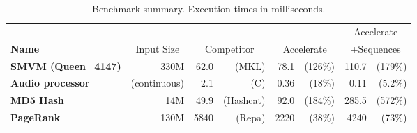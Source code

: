 


\begin{table}
\begin{center}
\begin{tabular}{lrrrrrrr}

                        &
                        &
                        &
                        &
                        &
                        & \multicolumn{2}{c}{Accelerate}
                        \\

  \textbf{Name}         & \multicolumn{1}{c}{Input Size}
                        & \multicolumn{2}{c}{Competitor}
                        & \multicolumn{2}{c}{Accelerate}
                        & \multicolumn{2}{c}{+Sequences}
                        \\

  \midrule

  \textbf{SMVM (Queen\_4147)}
                        & 330M
                        & 62.0
                        & (MKL)
                        & 78.1
                        & (126\%)
                        & 110.7
                        & (179\%)
                        \\

  \textbf{Audio processor}
                        & (continuous)
                        & 2.1
                        & (C)
                        & 0.36
                        & (18\%)
                        & 0.11
                        & (5.2\%)
                        \\

  \textbf{MD5 Hash}     & 14M
                        & 49.9
                        & (Hashcat)
                        & 92.0
                        & (184\%)
                        & 285.5
                        & (572\%)
                        \\

  \textbf{PageRank}     & 130M
                        & 5840
                        & (Repa)
                        & 2220
                        & (38\%)
                        & 4240
                        & (73\%)
                        \\

  \bottomrule
\end{tabular}
\end{center}
\caption{Benchmark summary. Execution times in milliseconds.}
\label{tab:benchmarks}
\end{table}



